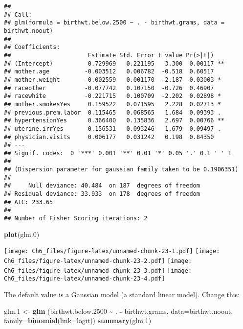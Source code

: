 \documentclass[
]{article}
\newenvironment{Shaded}{\begin{snugshade}}{\end{snugshade}}
\newcommand{\AttributeTok}[1]{\textcolor[rgb]{0.13,0.29,0.53}{#1}}
\newcommand{\FloatTok}[1]{\textcolor[rgb]{0.00,0.00,0.81}{#1}}
\newcommand{\FunctionTok}[1]{\textcolor[rgb]{0.13,0.29,0.53}{\textbf{#1}}}
\newcommand{\NormalTok}[1]{#1}
\newcommand{\OtherTok}[1]{\textcolor[rgb]{0.56,0.35,0.01}{#1}}
\newcommand{\SpecialCharTok}[1]{\textcolor[rgb]{0.81,0.36,0.00}{\textbf{#1}}}
\begin{document}
\begin{verbatim}
## 
## Call:
## glm(formula = birthwt.below.2500 ~ . - birthwt.grams, data = birthwt.noout)
## 
## Coefficients:
##                      Estimate Std. Error t value Pr(>|t|)   
## (Intercept)          0.729969   0.221195   3.300  0.00117 **
## mother.age          -0.003512   0.006782  -0.518  0.60517   
## mother.weight       -0.002559   0.001170  -2.187  0.03003 * 
## raceother           -0.077742   0.107150  -0.726  0.46907   
## racewhite           -0.221715   0.100709  -2.202  0.02898 * 
## mother.smokesYes     0.159522   0.071595   2.228  0.02713 * 
## previous.prem.labor  0.115465   0.068565   1.684  0.09393 . 
## hypertensionYes      0.366400   0.135836   2.697  0.00766 **
## uterine.irrYes       0.156531   0.093246   1.679  0.09497 . 
## physician.visits     0.006177   0.031242   0.198  0.84350   
## ---
## Signif. codes:  0 '***' 0.001 '**' 0.01 '*' 0.05 '.' 0.1 ' ' 1
## 
## (Dispersion parameter for gaussian family taken to be 0.1906351)
## 
##     Null deviance: 40.484  on 187  degrees of freedom
## Residual deviance: 33.933  on 178  degrees of freedom
## AIC: 233.65
## 
## Number of Fisher Scoring iterations: 2
\end{verbatim}

\begin{Shaded}
\begin{Highlighting}[]
\FunctionTok{plot}\NormalTok{(glm}\FloatTok{.0}\NormalTok{)}
\end{Highlighting}
\end{Shaded}

\texttt{[image: Ch6\_files/figure-latex/unnamed-chunk-23-1.pdf]}
\texttt{[image: Ch6\_files/figure-latex/unnamed-chunk-23-2.pdf]}
\texttt{[image: Ch6\_files/figure-latex/unnamed-chunk-23-3.pdf]}
\texttt{[image: Ch6\_files/figure-latex/unnamed-chunk-23-4.pdf]}

The default value is a Gaussian model (a standard linear model). Change
this:

\begin{Shaded}
\begin{Highlighting}[]
\NormalTok{glm}\FloatTok{.1} \OtherTok{\textless{}{-}} \FunctionTok{glm}\NormalTok{ (birthwt.below}\FloatTok{.2500} \SpecialCharTok{\textasciitilde{}}\NormalTok{ . }\SpecialCharTok{{-}}\NormalTok{ birthwt.grams, }\AttributeTok{data=}\NormalTok{birthwt.noout, }\AttributeTok{family=}\FunctionTok{binomial}\NormalTok{(}\AttributeTok{link=}\NormalTok{logit))}
\FunctionTok{summary}\NormalTok{(glm}\FloatTok{.1}\NormalTok{)}
\end{Highlighting}
\end{Shaded}
\end{document}
